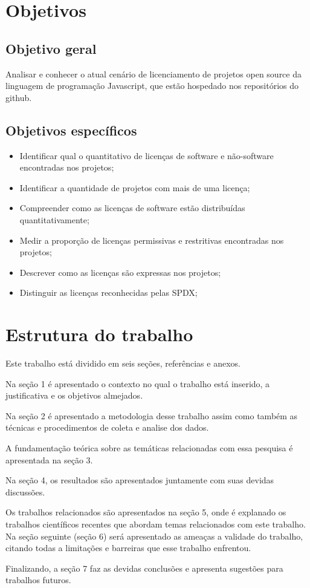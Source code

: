 \section{Objetivos}
\label{sec:objetivos}

\subsection{Objetivo geral}
\label{subsec:objetivogeral}
Analisar e conhecer o atual cenário de licenciamento de projetos open source da linguagem de programação Javascript, que estão hospedado nos repositórios do github.

\subsection{Objetivos específicos}
\label{subsec:objetivosespecificos} 

\begin{itemize}
\item Identificar qual o quantitativo de licenças de software e não-software encontradas nos projetos;
\item Identificar a quantidade de projetos com mais de uma licença;
\item Compreender como as licenças de software estão distribuídas quantitativamente;
\item Medir a proporção de licenças permissivas e restritivas encontradas nos projetos;
\item Descrever como as licenças são expressas nos projetos;
\item Distinguir as licenças reconhecidas pelas SPDX;
\end{itemize}

\section{Estrutura do trabalho}
\label{sec:estrututaTrabalho}

Este trabalho está dividido em seis seções, referências e anexos.

Na seção 1 é apresentado o contexto no qual o trabalho está inserido, a justificativa e os objetivos almejados.

Na seção 2 é apresentado a metodologia desse trabalho assim como também as técnicas e procedimentos de coleta e analise dos dados.

A fundamentação teórica sobre as temáticas relacionadas com essa pesquisa é apresentada na seção 3.

Na seção 4, os resultados são apresentados juntamente com suas devidas discussões.

Os trabalhos relacionados são apresentados na seção 5, onde é explanado os trabalhos científicos recentes que abordam temas relacionados com este trabalho. Na seção seguinte (seção 6) será apresentado as ameaças a validade do trabalho, citando todas a limitações e barreiras que esse trabalho enfrentou.

Finalizando, a seção 7 faz as devidas conclusões e apresenta sugestões para trabalhos futuros.
